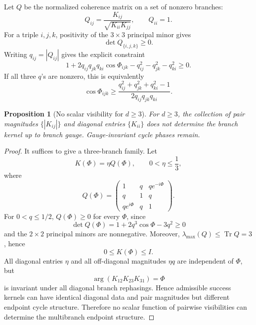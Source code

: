 \documentclass[reprint,aps,pra,superscriptaddress,nofootinbib,longbibliography]{revtex4-2}
\newtheorem{proposition}[theorem]{Proposition}
\newcommand{\Tr}{\operatorname{Tr}}
\begin{document}
Let \(Q\) be the normalized coherence matrix on a set of nonzero branches:
\begin{equation}
Q_{ij}
=
\frac{K_{ij}}{\sqrt{K_{ii}K_{jj}}},
\qquad
Q_{ii}=1.
\label{eq:Q}
\end{equation}
For a triple \(i,j,k\), positivity of the \(3\times3\) principal minor gives
\begin{equation}
\det Q_{\{i,j,k\}}\ge0.
\label{eq:triple-det}
\end{equation}
Writing \(q_{ij}=|Q_{ij}|\) gives the explicit constraint
\begin{equation}
1
+2q_{ij}q_{jk}q_{ki}\cos\Phi_{ijk}
-q_{ij}^2-q_{jk}^2-q_{ki}^2
\ge0.
\label{eq:triple-constraint}
\end{equation}
If all three \(q\)'s are nonzero, this is equivalently
\begin{equation}
\cos\Phi_{ijk}
\ge
\frac{
q_{ij}^2+q_{jk}^2+q_{ki}^2-1
}{
2q_{ij}q_{jk}q_{ki}
}.
\label{eq:cos-lower-bound}
\end{equation}

\begin{proposition}[No scalar visibility for \(d\ge3\)]
For \(d\ge3\), the collection of pair magnitudes \(\{|K_{ij}|\}\) and diagonal entries \(\{K_{ii}\}\) does not determine the branch kernel up to branch gauge.  Gauge-invariant cycle phases remain.
\end{proposition}

\begin{proof}
It suffices to give a three-branch family.  Let
\[
K(\Phi)=\eta Q(\Phi),
\qquad
0<\eta\le \frac13,
\]
where
\[
Q(\Phi)=
\begin{pmatrix}
1&q&q e^{-i\Phi}\\
q&1&q\\
q e^{i\Phi}&q&1
\end{pmatrix}.
\]
For \(0<q\le1/2\), \(Q(\Phi)\ge0\) for every \(\Phi\), since
\[
\det Q(\Phi)=1+2q^3\cos\Phi-3q^2\ge0
\]
and the \(2\times2\) principal minors are nonnegative.  Moreover,
\(\lambda_{\max}(Q)\le \Tr Q=3\), hence
\[
0\le K(\Phi)\le I.
\]
All diagonal entries \(\eta\) and all off-diagonal magnitudes \(\eta q\) are independent of \(\Phi\), but
\[
\arg(K_{12}K_{23}K_{31})=\Phi
\]
is invariant under all diagonal branch rephasings.  Hence admissible success kernels can have identical diagonal data and pair magnitudes but different endpoint cycle structure.  Therefore no scalar function of pairwise visibilities can determine the multibranch endpoint structure.
\end{proof}
\end{document}
